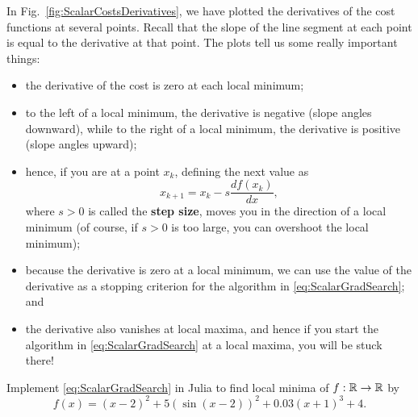 \begin{tcolorbox}[sharp corners, colback=green!30, colframe=green!80!blue,title=\textbf{Derivative of the Cost Tells You How to Move Toward a Local Minimum}]
In Fig.~\ref{fig:ScalarCostsDerivatives}, we have plotted the derivatives of the cost functions at several points. Recall that the slope of the line segment at each point is equal to the derivative at that point. The plots tell us some really important things:
\begin{itemize}
    \item the derivative of the cost is zero at each local minimum;
    \item to the left of a local minimum, the derivative is negative (slope angles downward), while to the right of a local minimum, the derivative is positive (slope angles upward);
    \item hence, if you are at a point $x_k$, defining the next value as
\begin{equation}
    \label{eq:ScalarGradSearch}
    x_{k+1}=x_k - s \frac{d f(x_k)}{dx},
    \end{equation}
    where $s>0$ is called the \textbf{step size}, moves you in the direction of a local minimum (of course, if $s>0$ is too large, you can overshoot the local minimum); 
    \item because the derivative is zero at a local minimum, we can use the value of the derivative as a stopping criterion for the algorithm in \eqref{eq:ScalarGradSearch}; and
    \item the derivative also vanishes at local maxima, and hence if you start the algorithm in \eqref{eq:ScalarGradSearch} at a local maxima, you will be stuck there! 
\end{itemize}

\end{tcolorbox}



\begin{example}
\label{ex:ScalarCostMinimization}
Implement \eqref{eq:ScalarGradSearch} in Julia to find local minima of $f:\mathbb R\to \mathbb R$ by
$$f(x)=(x-2)^2 + 5 (\sin(x-2))^2 + 0.03(x+1)^3 + 4.$$

\end{example}

